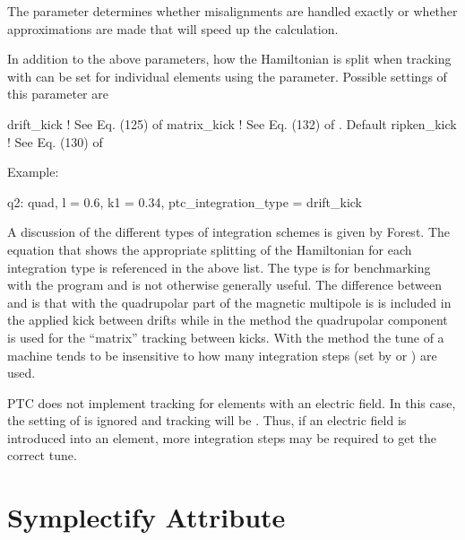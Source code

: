 The  parameter determines whether misalignments are handled exactly or
whether approximations are made that will speed up the calculation.

In addition to the above parameters, how the Hamiltonian is split when tracking with  can be
set for individual elements using the  parameter. Possible settings of this
parameter are
\begin{example}
  drift_kick    ! See Eq. (125) of \cite{b:geo.int}
  matrix_kick   ! See Eq. (132) of \cite{b:geo.int}. Default
  ripken_kick   ! See Eq. (130) of \cite{b:geo.int}
\end{example}
Example:
\begin{example}
  q2: quad, l = 0.6, k1 = 0.34, ptc_integration_type = drift_kick
\end{example}
A discussion of the different types of integration schemes is given by Forest\cite{b:geo.int}. The
equation that shows the appropriate splitting of the Hamiltonian for each integration type is
referenced in the above list. The  type is for benchmarking with the 
program and is not otherwise generally useful. The difference between  and
 is that with  the quadrupolar part of the magnetic multipole is is
included in the applied kick between drifts while in the  method the quadrupolar
component is used for the ``matrix'' tracking between kicks. With the  method the
tune of a machine tends to be insensitive to how many integration steps (set by  or
) are used.

PTC does not implement  tracking for elements with an electric field. In
this case, the setting of  is ignored and tracking will be
. Thus, if an electric field is introduced into an element, more
integration steps may be required to get the correct tune.


\section{Symplectify Attribute}
\label{s:symp}

